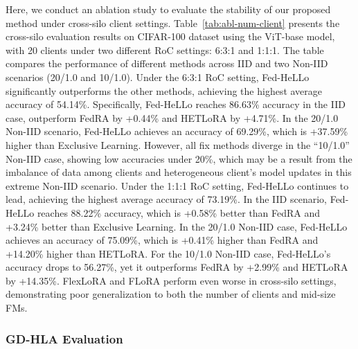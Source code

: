 \documentclass[lettersize,journal]{IEEEtran}
\begin{document}
Here, we conduct an ablation study to evaluate the stability of our proposed method under cross-silo client settings. 
Table~\ref{tab:abl-num-client} presents the cross-silo evaluation results on CIFAR-100 dataset using the ViT-base model, with 20 clients under two different RoC settings: 6:3:1 and 1:1:1. The table compares the performance of different methods across IID and two Non-IID scenarios (20/1.0 and 10/1.0). Under the 6:3:1 RoC setting, Fed-HeLLo significantly outperforms the other methods, achieving the highest average accuracy of 54.14\%. Specifically, Fed-HeLLo reaches 86.63\% accuracy in the IID case, outperform FedRA by +0.44\% and HETLoRA by +4.71\%. In the 20/1.0 Non-IID scenario, Fed-HeLLo achieves an accuracy of 69.29\%, which is +37.59\% higher than Exclusive Learning. However, all fix methods diverge in the ``10/1.0'' Non-IID case, showing low accuracies under 20\%, which may be a result from the imbalance of data among clients and heterogeneous client's model updates in this extreme Non-IID scenario. Under the 1:1:1 RoC setting, Fed-HeLLo continues to lead, achieving the highest average accuracy of 73.19\%. In the IID scenario, Fed-HeLLo reaches 88.22\% accuracy, which is +0.58\% better than FedRA and +3.24\% better than Exclusive Learning. In the 20/1.0 Non-IID case, Fed-HeLLo achieves an accuracy of 75.09\%, which is +0.41\% higher than FedRA and +14.20\% higher than HETLoRA. For the 10/1.0 Non-IID case, Fed-HeLLo's accuracy drops to 56.27\%, yet it outperforms FedRA by +2.99\% and HETLoRA by +14.35\%. {FlexLoRA and FLoRA perform even worse in cross-silo settings, demonstrating poor generalization to both the number of clients and mid-size FMs.}

\subsubsection{GD-HLA Evaluation}\label{subsubsection:GD-HLA}
\end{document}
